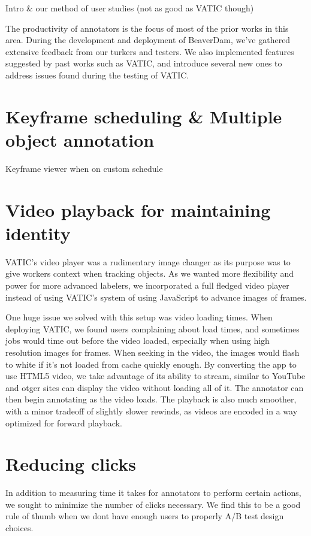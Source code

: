 
Intro \& our method of user studies (not as good as VATIC though)

The productivity of annotators is the focus of most of the prior works in this area.
During the development and deployment of BeaverDam, we've gathered extensive feedback from our turkers and testers.
We also implemented features suggested by past works such as VATIC,
and introduce several new ones to address issues found during the testing of VATIC.

\section{Keyframe scheduling \& Multiple object annotation}

Keyframe viewer when on custom schedule

\section{Video playback for maintaining identity}

VATIC's video player was a rudimentary image changer as its purpose was to give workers context when tracking objects.
As we wanted more flexibility and power for more advanced labelers, we incorporated a full fledged video player instead of using VATIC's system of using JavaScript to advance images of frames.

One huge issue we solved with this setup was video loading times.
When deploying VATIC, we found users complaining about load times, and sometimes jobs would time out before the video loaded, especially when using high resolution images for frames.
When seeking in the video, the images would flash to white if it's not loaded from cache quickly enough.
By converting the app to use HTML5 video, we take advantage of its ability to stream, similar to YouTube and otger sites can display the video without loading all of it.
The annotator can then begin annotating as the video loads.
The playback is also much smoother, with a minor tradeoff of slightly slower rewinds, as videos are encoded in a way optimized for forward playback.

\section{Reducing clicks}

In addition to measuring time it takes for annotators to perform certain actions, we sought to minimize the number of clicks necessary.
We find this to be a good rule of thumb when we dont have enough users to properly A/B test design choices.

